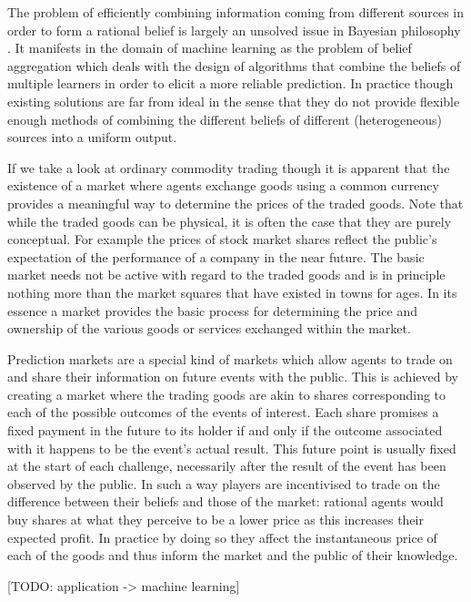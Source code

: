\documentclass[bsc,frontabs,twoside,singlespacing,parskip,deptreport]{infthesis}     %
\begin{document}
The problem of efficiently combining information coming from different sources in order to form a rational belief is largely an unsolved issue in Bayesian philosophy \cite{greene_collective_2010}. It manifests in the domain of machine learning as the problem of belief aggregation which deals with the design of algorithms that combine the beliefs of multiple learners in order to elicit a more reliable prediction. In practice though existing solutions are far from ideal in the sense that they do not provide flexible enough methods of combining the different beliefs of different (heterogeneous) sources into a uniform output. 

    If we take a look at ordinary commodity trading though it is apparent that the existence of a market where agents exchange goods using a common currency provides a meaningful way to determine the prices of the traded goods. Note that while the traded goods can be physical, it is often the case that they are purely conceptual. For example the prices of stock market shares reflect the public's expectation of the performance of a company in the near future. The basic market needs not be active with regard to the traded goods and is in principle nothing more than the market squares that have existed in towns for ages. In its essence a market provides the basic process for determining the price and ownership of the various goods or services exchanged within the market.

    Prediction markets are a special kind of markets which allow agents to trade on and share their information on future events with the public. This is achieved by creating a market where the trading goods are akin to shares corresponding to each of the possible outcomes of the events of interest. Each share promises a fixed payment in the future to its holder if and only if the outcome associated with it happens to be the event's actual result. This future point is usually fixed at the start of each challenge, necessarily after the result of the event has been observed by the public. In such a way players are incentivised to trade on the difference between their beliefs and those of the market: rational agents would buy shares at what they perceive to be a lower price as this increases their expected profit. In practice by doing so they affect the instantaneous price of each of the goods and thus inform the market and the public of their knowledge. 

[TODO: application -> machine learning]
\end{document}
